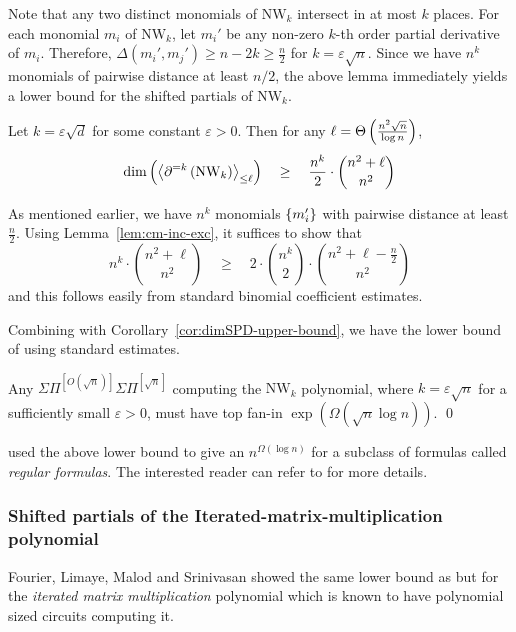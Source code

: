 \documentclass{birkjour}
\newcommand{\spaced}[1]{\quad#1\quad}
\newcommand{\SPD}[3]{\inangle{\partial^{=#1}\inparen{#3}}_{\leq #2}}
\newcommand{\mySPSP}[2]{\Sigma\Pi^{[#1]}\Sigma\Pi^{[#2]}}
\renewcommand{\epsilon}{\varepsilon}
\providecommand{\DIFaddtex}[1]{{\protect\color{blue}\uwave{#1}}} %
\providecommand{\DIFaddbegin}{} %
\providecommand{\DIFaddend}{} %
\providecommand{\DIFadd}[1]{\texorpdfstring{\DIFaddtex{#1}}{#1}} %
\begin{document}
Note that any two distinct monomials of $\mathrm{NW}_k$ intersect in at most $k$ places. For each monomial $m_i$ of $\mathrm{NW}_k$, let $m_i'$ be any non-zero $k$-th order partial derivative of $m_i$. Therefore, $\Delta(m_i', m_j') \geq n -2k \geq \frac{n}{2}$ for $k = \epsilon \sqrt{n}$. Since we have $n^k$ monomials of pairwise distance at least $n/2$, the above lemma immediately yields a lower bound for the shifted partials of $\mathrm{NW}_k$. 

\begin{theorem}
Let $k = \epsilon \sqrt{d}$ for some constant $\epsilon > 0$. Then for any  $\ell = \Theta\left(\frac{n^2 \sqrt{n}}{\log n}\right)$,
$$
\dim\inparen{\SPD{k}{\ell}{\mathrm{NW}_k}} \spaced{\geq} \frac{n^k}{2} \cdot \binom{n^2 + \ell}{n^2}
$$
\end{theorem}
\begin{proof-sketch}
As mentioned earlier, we have $n^k$ monomials $\left\{m_i'\right\}$ with pairwise distance at least $\frac{n}{2}$. Using Lemma~\ref{lem:cm-inc-exc}, it suffices to show that
$$
n^k \cdot \binom{n^2 + \ell}{n^2} \spaced{\geq} 2 \cdot \binom{n^k}{2} \cdot \binom{n^2 + \ell - \frac{n}{2}}{n^2}
$$
and this follows easily from standard binomial coefficient estimates. 
\end{proof-sketch}

Combining with Corollary~\ref{cor:dimSPD-upper-bound}, we have the lower bound of \cite{KSS13} using standard estimates. 

\begin{theorem}
Any $\mySPSP{O(\sqrt{n})}{\sqrt{n}}$ computing the $\mathrm{NW}_k$ polynomial, where $k = \epsilon \sqrt{n}$ for a sufficiently small $\epsilon > 0$, must have top fan-in $\exp(\Omega(\sqrt{n}\log n))$. \qed
\end{theorem}

\cite{KSS13} used the above lower bound to give an $n^{\Omega(\log n)}$ \DIFaddbegin \DIFadd{lower bound }\DIFaddend for a subclass of formulas called \emph{regular formulas}. The interested reader can refer to \cite{KSS13} for more details. 

\subsubsection{Shifted partials of the Iterated-matrix-multiplication polynomial}

Fourier, Limaye, Malod and Srinivasan \cite{FLMS13} showed the same lower bound as \cite{KSS13} but for the \emph{iterated matrix multiplication} polynomial which is known to have polynomial sized circuits computing it. 
\end{document}
